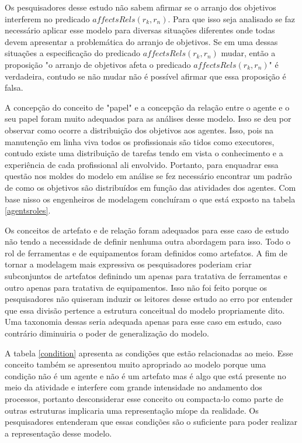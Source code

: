 Os pesquisadores desse estudo não sabem afirmar se o arranjo dos objetivos interferem no predicado $affectsRels(r_k,r_n)$. Para que isso seja analisado se faz necessário aplicar esse modelo para diversas situações diferentes onde todas devem apresentar a problemática do arranjo de objetivos. Se em uma dessas situações a especificação do predicado $affectsRels(r_k,r_n)$ mudar, então a proposição "o arranjo de objetivos afeta o predicado $affectsRels(r_k,r_n)$" é verdadeira, contudo se não mudar não é possível afirmar que essa proposição é falsa. 

A concepção do conceito de "papel" e a concepção da relação entre o agente e o seu papel foram muito adequados para as análises desse modelo. Isso se deu por observar como ocorre a distribuição dos objetivos aos agentes. Isso, pois na manutenção em linha viva todos os profissionais são tidos como executores, contudo existe uma distribuição de tarefas tendo em vista o conhecimento e a experiência de cada profissional ali envolvido. Portanto, para enquadrar essa questão nos moldes do modelo em análise se fez necessário encontrar um padrão de como os objetivos são distribuídos em função das atividades dos agentes. Com base nisso os engenheiros de modelagem concluíram o que está exposto na tabela \ref{agentsroles}.

Os conceitos de artefato e de relação foram adequados para esse caso de estudo não tendo a necessidade de definir nenhuma outra abordagem para isso. Todo o rol de ferramentas e de equipamentos foram definidos como artefatos. A fim de tornar a modelagem mais expressiva os pesquisadores poderiam criar subconjuntos de artefatos definindo um apenas para tratativa de ferramentas e outro apenas para tratativa de equipamentos. Isso não foi feito porque os pesquisadores não quiseram induzir os leitores desse estudo ao erro por entender que essa divisão pertence a estrutura conceitual do modelo propriamente dito. Uma taxonomia dessas seria adequada apenas para esse caso em estudo, caso contrário diminuiria o poder de generalização do modelo. 

A tabela \ref{condition} apresenta as condições que estão relacionadas ao meio. Esse conceito também se apresentou muito apropriado ao modelo porque uma condição não é um agente e não é um artefato mas é algo que está presente no meio da atividade e interfere com grande intensidade no andamento dos processos, portanto desconsiderar esse conceito ou compacta-lo como parte de outras estruturas implicaria uma representação míope da realidade. Os pesquisadores entenderam que essas condições são o suficiente para poder realizar a representação desse modelo.

